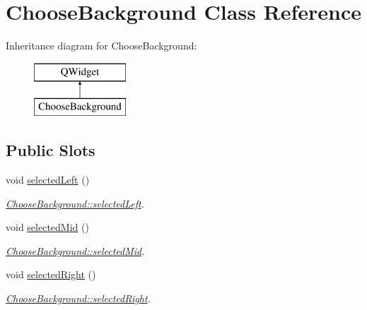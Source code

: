 \hypertarget{class_choose_background}{}\section{Choose\+Background Class Reference}
\label{class_choose_background}
Inheritance diagram for Choose\+Background\+:\begin{figure}[H]
\begin{center}
\leavevmode
\includegraphics[height=2.000000cm]{class_choose_background}
\end{center}
\end{figure}
\subsection*{Public Slots}
\begin{DoxyCompactItemize}
\item 
void \hyperlink{class_choose_background_a134632704516ff01d21147a6f7238b8f}{selected\+Left} ()
\begin{DoxyCompactList}\small\item\em \hyperlink{class_choose_background_a134632704516ff01d21147a6f7238b8f}{Choose\+Background\+::selected\+Left}. \end{DoxyCompactList}\item 
void \hyperlink{class_choose_background_a9fa9d22a3cfd437307117bb32036b731}{selected\+Mid} ()
\begin{DoxyCompactList}\small\item\em \hyperlink{class_choose_background_a9fa9d22a3cfd437307117bb32036b731}{Choose\+Background\+::selected\+Mid}. \end{DoxyCompactList}\item 
void \hyperlink{class_choose_background_afc6ef25b1b6e1ed1e9842be71542a092}{selected\+Right} ()
\begin{DoxyCompactList}\small\item\em \hyperlink{class_choose_background_afc6ef25b1b6e1ed1e9842be71542a092}{Choose\+Background\+::selected\+Right}. \end{DoxyCompactList}\end{DoxyCompactItemize}
